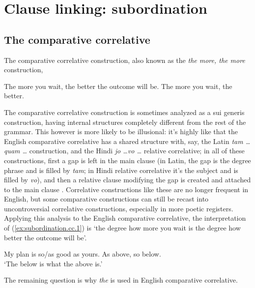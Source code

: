\documentclass[UTF8, a4paper, oneside, scheme=plain, 12pt]{ctexbook}
\newcommand{\form}[1]{\emph{#1}}
\newcommand{\translate}[1]{`#1'}
\begin{document}
\section{Clause linking: subordination}\label{sec:clause-linking.subordination}

\subsection{The comparative correlative} 

The comparative correlative construction, 
also known as the \form{the more, the more} construction, 

\begin{exe}
    \ex\label{ex:subordination.cc.1} The more you wait, the better the outcome will be. 
    \ex The more you wait, the better. 
\end{exe}

The comparative correlative construction 
is sometimes analyzed as a sui generis construction, 
having internal structures completely different from the rest of the grammar. 
This however is more likely to be illusional: 
it's highly like that the English comparative correlative 
has a shared structure with, say, 
the Latin \form{tam \dots quam \dots} construction, 
and the Hindi \form{jo \dots vo \dots} relative correlative; 
in all of these constructions, 
first a gap is left in the main clause
(in Latin, the gap is the degree phrase and is filled by \form{tam};
in Hindi relative correlative it's the subject and is filled by \form{vo}),
and then a relative clause modifying the gap is created 
and attached to the main clause \citep{den2005comparative}. 
Correlative constructions like these are no longer frequent in English,
but some comparative constructions 
can still be recast into uncontroversial correlative constructions,
especially in more poetic registers. 
Applying this analysis to the English comparative correlative, 
the interpretation of (\ref{ex:subordination.cc.1})
is \translate{the degree how more you wait is the degree how better the outcome will be}.

\begin{exe}
    \ex My plan is so/as good as yours. 
    \ex As above, so below. \\ 
    \translate{The below is what the above is.} 
    \ex 
\end{exe}

The remaining question is why \form{the} is used in English comparative correlative.
\end{document}

